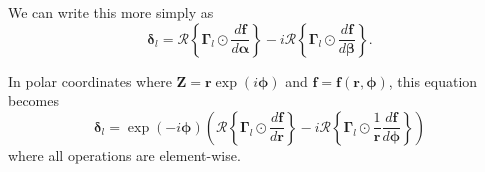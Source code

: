 We can write this more simply as 
\begin{equation}
\boldsymbol{\delta}_l = \mathcal{R}\left\{\bm{\Gamma}_l \odot \frac{d\mathbf{f}}{d\bm{\alpha}} \right\} - i \mathcal{R}\left\{ \bm{\Gamma}_l \odot \frac{d\mathbf{f}}{d\bm{\beta}}\right\}.
\end{equation}

In polar coordinates where $\mathbf{Z} = \mathbf{r}\exp{(i\bm{\phi})}$ and $\mathbf{f} = \mathbf{f}(\mathbf{r},\bm{\phi})$, this equation becomes
\begin{equation}
\boldsymbol{\delta}_l = \exp{(-i\bm{\phi})}\left(\mathcal{R}\left\{\bm{\Gamma}_l \odot \frac{d\mathbf{f}}{d\mathbf{r}} \right\} - i\mathcal{R}\left\{ \bm{\Gamma}_l \odot \frac{1}{\mathbf{r}}\frac{d\mathbf{f}}{d\bm{\phi}} \right\}  \right) \label{eqn:noholo}
\end{equation}
where all operations are element-wise.
